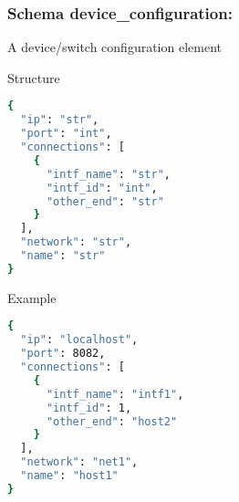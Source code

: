 \newpage
\subsubsection{Schema device\_configuration:}
\label{esmf_device_configuration}
A device/switch configuration element
\begin{codes}
\item[Structure] \begin{lstlisting}[language=bash]
{
  "ip": "str",
  "port": "int",
  "connections": [
    {
      "intf_name": "str",
      "intf_id": "int",
      "other_end": "str"
    }
  ],
  "network": "str",
  "name": "str"
}
\end{lstlisting}
\end{codes}
\begin{codes}
\item[Example] \begin{lstlisting}[language=bash]
{
  "ip": "localhost",
  "port": 8082,
  "connections": [
    {
      "intf_name": "intf1",
      "intf_id": 1,
      "other_end": "host2"
    }
  ],
  "network": "net1",
  "name": "host1"
}
\end{lstlisting}
\end{codes}

\newpage
